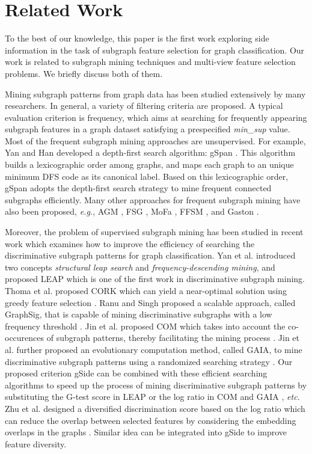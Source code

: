 \documentclass[conference]{IEEEtran}
\newcommand{\gscore}[0]{gSide}
\begin{document}
\section{Related Work}\label{sec:relatedwork}

To the best of our knowledge, this paper is the first work exploring side information in the task of subgraph feature selection for graph classification. Our work is related to subgraph mining techniques and multi-view feature selection problems. We briefly discuss both of them.

Mining subgraph patterns from graph data has been studied extensively by many researchers. In general, a variety of filtering criteria are proposed. A typical evaluation criterion is frequency, which aims at searching for frequently appearing subgraph features in a graph dataset satisfying a prespecified \emph{min\_sup} value. Most of the frequent subgraph mining approaches are unsupervised. For example, Yan and Han developed a depth-first search algorithm: gSpan \cite{yan2002gspan}. This algorithm builds a lexicographic order among graphs, and maps each graph to an unique minimum DFS code as its canonical label. Based on this lexicographic order, gSpan adopts the depth-first search strategy to mine frequent connected subgraphs efficiently. Many other approaches for frequent subgraph mining have also been proposed, \emph{e.g.}, AGM \cite{inokuchi2000apriori}, FSG \cite{kuramochi2001frequent}, MoFa \cite{borgelt2002mining}, FFSM \cite{huan2003efficient}, and Gaston \cite{nijssen2004quickstart}.

Moreover, the problem of supervised subgraph mining has been studied in recent work which examines how to improve the efficiency of searching the discriminative subgraph patterns for graph classification. Yan et al. introduced two concepts \emph{structural leap search} and \emph{frequency-descending mining}, and proposed LEAP \cite{yan2008mining} which is one of the first work in discriminative subgraph mining. Thoma et al. proposed CORK which can yield a near-optimal solution using greedy feature selection \cite{thoma2009near}. Ranu and Singh proposed a scalable approach, called GraphSig, that is capable of mining discriminative subgraphs with a low frequency threshold \cite{ranu2009graphsig}. Jin et al. proposed COM which takes into account the co-occurences of subgraph patterns, thereby facilitating the mining process \cite{jin2009graph}. Jin et al. further proposed an evolutionary computation  method, called GAIA, to mine discriminative subgraph patterns using a randomized searching strategy \cite{jin2010gaia}. Our proposed criterion {\gscore} can be combined with these efficient searching algorithms to speed up the process of mining discriminative subgraph patterns by substituting the G-test score in LEAP \cite{yan2008mining} or the log ratio in COM \cite{jin2009graph} and GAIA \cite{jin2010gaia}, \emph{etc.} Zhu et al. designed a diversified discrimination score based on the log ratio which can reduce the overlap between selected features by considering the embedding overlaps in the graphs \cite{zhu2012graph}. Similar idea can be integrated into {\gscore} to improve feature diversity.
\end{document}
